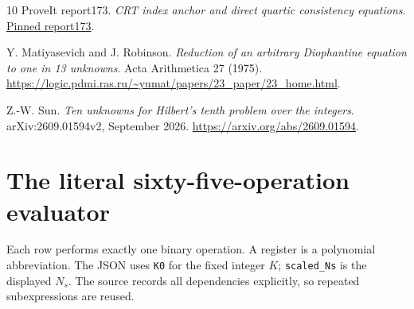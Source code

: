 \documentclass[11pt,letterpaper]{article}
\theoremstyle{definition}
\newcommand{\code}[1]{\texttt{\small #1}}
\newcommand{\repo}{https://github.com/VladimirReshetnikov/ProveIt}
\newcommand{\sourcepin}{02a78a08603cbae248c19c23a75907c6c6bd6443}
\begin{document}
\begin{thebibliography}{10}
ProveIt report173.
\emph{CRT index anchor and direct quartic consistency equations}.
\href{\repo/blob/\sourcepin/Computability/DiophantineConsistency/con-zfc-diophantine-forms/173-crt-index-anchor-215/README.md}
{Pinned report173}.

Y. Matiyasevich and J. Robinson.
\emph{Reduction of an arbitrary Diophantine equation to one in 13 unknowns}.
Acta Arithmetica 27 (1975).
\url{https://logic.pdmi.ras.ru/~yumat/papers/23_paper/23_home.html}.

Z.-W. Sun.
\emph{Ten unknowns for Hilbert's tenth problem over the integers}.
arXiv:2609.01594v2, September 2026.
\url{https://arxiv.org/abs/2609.01594}.
\end{thebibliography}

\clearpage
\appendix
\section{The literal sixty-five-operation evaluator}\label{app:gates}

Each row performs exactly one binary operation. A register is a polynomial
abbreviation. The JSON uses \code{K0} for the fixed integer \(K\);
\code{scaled\_Ns} is the displayed \(N_s\). The source records all
dependencies explicitly, so repeated subexpressions are reused.
\end{document}
